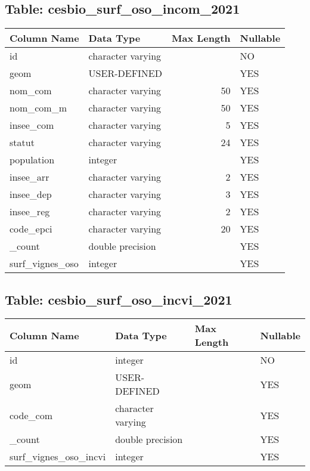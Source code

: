 \subsection*{Table: cesbio_surf_oso_incom_2021}
\begin{tabular}{llrl}
\hline
 Column Name     & Data Type         &   Max Length & Nullable   \\
\hline
 id              & character varying &              & NO         \\
 geom            & USER-DEFINED      &              & YES        \\
 nom_com         & character varying &           50 & YES        \\
 nom_com_m       & character varying &           50 & YES        \\
 insee_com       & character varying &            5 & YES        \\
 statut          & character varying &           24 & YES        \\
 population      & integer           &              & YES        \\
 insee_arr       & character varying &            2 & YES        \\
 insee_dep       & character varying &            3 & YES        \\
 insee_reg       & character varying &            2 & YES        \\
 code_epci       & character varying &           20 & YES        \\
 _count          & double precision  &              & YES        \\
 surf_vignes_oso & integer           &              & YES        \\
\hline
\end{tabular}
\subsection*{Table: cesbio_surf_oso_incvi_2021}
\begin{tabular}{llll}
\hline
 Column Name           & Data Type         & Max Length   & Nullable   \\
\hline
 id                    & integer           &              & NO         \\
 geom                  & USER-DEFINED      &              & YES        \\
 code_com              & character varying &              & YES        \\
 _count                & double precision  &              & YES        \\
 surf_vignes_oso_incvi & integer           &              & YES        \\
\hline
\end{tabular}
